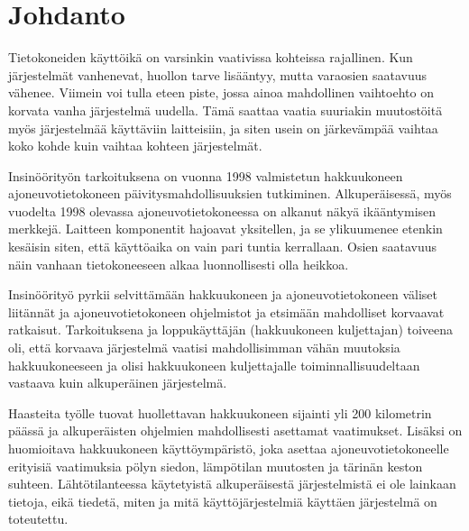 \newpage

\pagestyle{plain}

\setcounter{page}{1} %
\ClearWallPaper

\chapter{Johdanto}

Tietokoneiden käyttöikä on varsinkin vaativissa kohteissa rajallinen. Kun järjestelmät vanhenevat, huollon tarve lisääntyy, mutta varaosien saatavuus vähenee. Viimein voi tulla eteen piste, jossa ainoa mahdollinen vaihtoehto on korvata vanha järjestelmä uudella. Tämä saattaa vaatia suuriakin muutostöitä myös järjestelmää käyttäviin laitteisiin, ja siten usein on järkevämpää vaihtaa koko kohde kuin vaihtaa kohteen järjestelmät.

Insinöörityön tarkoituksena on vuonna 1998 valmistetun hakkuukoneen ajoneuvotietokoneen päivitysmahdollisuuksien tutkiminen. Alkuperäisessä, myös vuodelta 1998 olevassa ajoneuvotietokoneessa on alkanut näkyä ikääntymisen merkkejä. Laitteen komponentit hajoavat yksitellen, ja se ylikuumenee etenkin kesäisin siten, että käyttöaika on vain pari tuntia kerrallaan. Osien saatavuus näin vanhaan tietokoneeseen alkaa luonnollisesti olla heikkoa.

Insinöörityö pyrkii selvittämään hakkuukoneen ja ajoneuvotietokoneen väliset liitännät ja ajoneuvotietokoneen ohjelmistot ja etsimään mahdolliset korvaavat ratkaisut. Tarkoituksena ja loppukäyttäjän (hakkuukoneen kuljettajan) toiveena oli, että korvaava järjestelmä vaatisi mahdollisimman vähän muutoksia hakkuukoneeseen ja olisi hakkuukoneen kuljettajalle toiminnallisuudeltaan vastaava kuin alkuperäinen järjestelmä.

Haasteita työlle tuovat huollettavan hakkuukoneen sijainti yli 200 kilometrin päässä ja alkuperäisten ohjelmien mahdollisesti asettamat vaatimukset. Lisäksi on huomioitava hakkuukoneen käyttöympäristö, joka asettaa ajoneuvotietokoneelle erityisiä vaatimuksia pölyn siedon, lämpötilan muutosten ja tärinän keston suhteen. Lähtötilanteessa käytetyistä alkuperäisestä järjestelmistä ei ole lainkaan tietoja, eikä tiedetä, miten ja mitä käyttöjärjestelmiä käyttäen järjestelmä on toteutettu.

